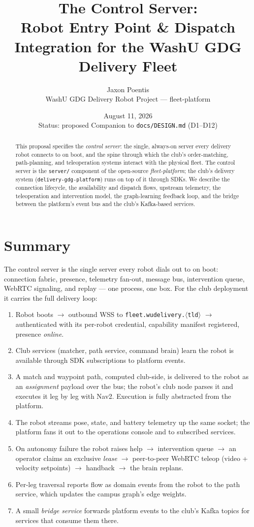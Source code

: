 \documentclass[11pt]{article}
\title{The Control Server:\\ \large Robot Entry Point \& Dispatch Integration for the WashU GDG Delivery Fleet}
\author{Jaxon Poentis \\ \small WashU GDG Delivery Robot Project --- fleet-platform}
\date{August 11, 2026 \\ \small Status: proposed \quad Companion to \texttt{docs/DESIGN.md} (D1--D12)}
\begin{document}
\maketitle

\begin{abstract}
This proposal specifies the \emph{control server}: the single, always-on server every
delivery robot connects to on boot, and the spine through which the club's
order-matching, path-planning, and teleoperation systems interact with the physical
fleet. The control server is the \texttt{server/} component of the open-source
\emph{fleet-platform}; the club's delivery system (\texttt{delivery-gdg-platform}) runs
on top of it through SDKs. We describe the connection lifecycle, the availability and
dispatch flows, upstream telemetry, the teleoperation and intervention model, the
graph-learning feedback loop, and the bridge between the platform's event bus and the
club's Kafka-based services.
\end{abstract}

\section{Summary}

The control server is the single server every robot dials out to on boot: connection
fabric, presence, telemetry fan-out, message bus, intervention queue, WebRTC signaling,
and replay --- one process, one box. For the club deployment it carries the full
delivery loop:

\begin{enumerate}[itemsep=1pt]
  \item Robot boots $\to$ outbound WSS to \texttt{fleet.wudelivery.}$\langle$\texttt{tld}$\rangle$
        $\to$ authenticated with its per-robot credential, capability manifest
        registered, presence \emph{online}.
  \item Club services (matcher, path service, command brain) learn the robot is
        available through SDK subscriptions to platform events.
  \item A match and waypoint path, computed club-side, is delivered to the robot as an
        \emph{assignment} payload over the bus; the robot's club node parses it and
        executes it leg by leg with Nav2. Execution is fully abstracted from the
        platform.
  \item The robot streams pose, state, and battery telemetry up the same socket; the
        platform fans it out to the operations console and to subscribed services.
  \item On autonomy failure the robot raises help $\to$ intervention queue $\to$ an
        operator claims an exclusive \emph{lease} $\to$ peer-to-peer WebRTC teleop
        (video + velocity setpoints) $\to$ handback $\to$ the brain replans.
  \item Per-leg traversal reports flow as domain events from the robot to the path
        service, which updates the campus graph's edge weights.
  \item A small \emph{bridge service} forwards platform events to the club's Kafka
        topics for services that consume them there.
\end{enumerate}
\end{document}
